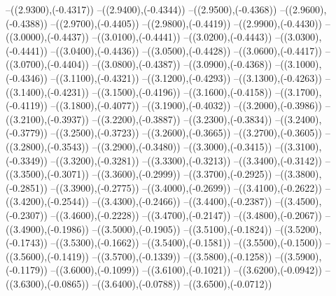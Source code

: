 {	--({\sx*(2.9300)},{\sy*(-0.4317)})
	--({\sx*(2.9400)},{\sy*(-0.4344)})
	--({\sx*(2.9500)},{\sy*(-0.4368)})
	--({\sx*(2.9600)},{\sy*(-0.4388)})
	--({\sx*(2.9700)},{\sy*(-0.4405)})
	--({\sx*(2.9800)},{\sy*(-0.4419)})
	--({\sx*(2.9900)},{\sy*(-0.4430)})
	--({\sx*(3.0000)},{\sy*(-0.4437)})
	--({\sx*(3.0100)},{\sy*(-0.4441)})
	--({\sx*(3.0200)},{\sy*(-0.4443)})
	--({\sx*(3.0300)},{\sy*(-0.4441)})
	--({\sx*(3.0400)},{\sy*(-0.4436)})
	--({\sx*(3.0500)},{\sy*(-0.4428)})
	--({\sx*(3.0600)},{\sy*(-0.4417)})
	--({\sx*(3.0700)},{\sy*(-0.4404)})
	--({\sx*(3.0800)},{\sy*(-0.4387)})
	--({\sx*(3.0900)},{\sy*(-0.4368)})
	--({\sx*(3.1000)},{\sy*(-0.4346)})
	--({\sx*(3.1100)},{\sy*(-0.4321)})
	--({\sx*(3.1200)},{\sy*(-0.4293)})
	--({\sx*(3.1300)},{\sy*(-0.4263)})
	--({\sx*(3.1400)},{\sy*(-0.4231)})
	--({\sx*(3.1500)},{\sy*(-0.4196)})
	--({\sx*(3.1600)},{\sy*(-0.4158)})
	--({\sx*(3.1700)},{\sy*(-0.4119)})
	--({\sx*(3.1800)},{\sy*(-0.4077)})
	--({\sx*(3.1900)},{\sy*(-0.4032)})
	--({\sx*(3.2000)},{\sy*(-0.3986)})
	--({\sx*(3.2100)},{\sy*(-0.3937)})
	--({\sx*(3.2200)},{\sy*(-0.3887)})
	--({\sx*(3.2300)},{\sy*(-0.3834)})
	--({\sx*(3.2400)},{\sy*(-0.3779)})
	--({\sx*(3.2500)},{\sy*(-0.3723)})
	--({\sx*(3.2600)},{\sy*(-0.3665)})
	--({\sx*(3.2700)},{\sy*(-0.3605)})
	--({\sx*(3.2800)},{\sy*(-0.3543)})
	--({\sx*(3.2900)},{\sy*(-0.3480)})
	--({\sx*(3.3000)},{\sy*(-0.3415)})
	--({\sx*(3.3100)},{\sy*(-0.3349)})
	--({\sx*(3.3200)},{\sy*(-0.3281)})
	--({\sx*(3.3300)},{\sy*(-0.3213)})
	--({\sx*(3.3400)},{\sy*(-0.3142)})
	--({\sx*(3.3500)},{\sy*(-0.3071)})
	--({\sx*(3.3600)},{\sy*(-0.2999)})
	--({\sx*(3.3700)},{\sy*(-0.2925)})
	--({\sx*(3.3800)},{\sy*(-0.2851)})
	--({\sx*(3.3900)},{\sy*(-0.2775)})
	--({\sx*(3.4000)},{\sy*(-0.2699)})
	--({\sx*(3.4100)},{\sy*(-0.2622)})
	--({\sx*(3.4200)},{\sy*(-0.2544)})
	--({\sx*(3.4300)},{\sy*(-0.2466)})
	--({\sx*(3.4400)},{\sy*(-0.2387)})
	--({\sx*(3.4500)},{\sy*(-0.2307)})
	--({\sx*(3.4600)},{\sy*(-0.2228)})
	--({\sx*(3.4700)},{\sy*(-0.2147)})
	--({\sx*(3.4800)},{\sy*(-0.2067)})
	--({\sx*(3.4900)},{\sy*(-0.1986)})
	--({\sx*(3.5000)},{\sy*(-0.1905)})
	--({\sx*(3.5100)},{\sy*(-0.1824)})
	--({\sx*(3.5200)},{\sy*(-0.1743)})
	--({\sx*(3.5300)},{\sy*(-0.1662)})
	--({\sx*(3.5400)},{\sy*(-0.1581)})
	--({\sx*(3.5500)},{\sy*(-0.1500)})
	--({\sx*(3.5600)},{\sy*(-0.1419)})
	--({\sx*(3.5700)},{\sy*(-0.1339)})
	--({\sx*(3.5800)},{\sy*(-0.1258)})
	--({\sx*(3.5900)},{\sy*(-0.1179)})
	--({\sx*(3.6000)},{\sy*(-0.1099)})
	--({\sx*(3.6100)},{\sy*(-0.1021)})
	--({\sx*(3.6200)},{\sy*(-0.0942)})
	--({\sx*(3.6300)},{\sy*(-0.0865)})
	--({\sx*(3.6400)},{\sy*(-0.0788)})
	--({\sx*(3.6500)},{\sy*(-0.0712)})
}
